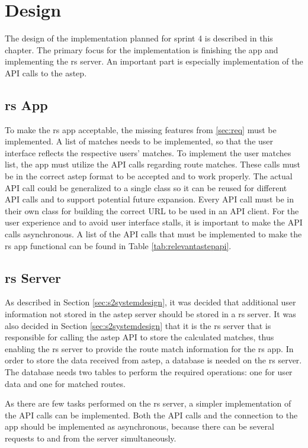 \section{Design}
The design of the implementation planned for sprint 4 is described in this chapter.
The primary focus for the implementation is finishing the app and implementing the \gls{rs} server.
An important part is especially implementation of the API calls to the \gls{astep}.

\subsection{\gls{rs} App}
To make the \gls{rs} app acceptable, the missing features from \ref{sec:req} must be implemented.
A list of matches needs to be implemented, so that the user interface reflects the respective users' matches.
To implement the user matches list, the app must utilize the API calls regarding route matches.
These calls must be in the correct \gls{astep} format to be accepted and to work properly.
The actual API call could be generalized to a single class so it can be reused for different API calls and to support potential future expansion.
Every API call must be in their own class for building the correct URL to be used in an API client.
For the user experience and to avoid user interface stalls, it is important to make the API calls asynchronous. 
A list of the API calls that must be implemented to make the \gls{rs} app functional can be found in Table \ref{tab:relevantastepapi}.

\subsection{\gls{rs} Server}
As described in Section \ref{sec:s2systemdesign}, it was decided that additional user information not stored in the \gls{astep} server should be stored in a \gls{rs} server.
It was also decided in Section \ref{sec:s2systemdesign} that it is the \gls{rs} server that is responsible for calling the \gls{astep} API to store the calculated matches, thus enabling the \gls{rs} server to provide the route match information for the \gls{rs} app.
In order to store the data received from \gls{astep}, a database is needed on the \gls{rs} server.
The database needs two tables to perform the required operations: one for user data and one for matched routes.

As there are few tasks performed on the \gls{rs} server, a simpler implementation of the API calls can be implemented.
Both the API calls and the connection to the app should be implemented as asynchronous, because there can be several requests to and from the server simultaneously. 